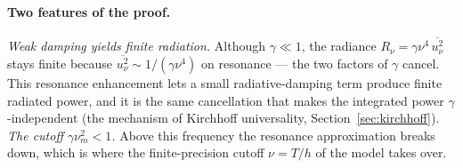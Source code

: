 \paragraph{Two features of the proof.}
\emph{Weak damping yields finite radiation.} Although $\gamma \ll 1$, the radiance $R_\nu = \gamma\nu^4\,\overline{u_\nu^2}$ stays finite because $\overline{u_\nu^2} \sim 1/(\gamma\nu^4)$ on resonance --- the two factors of $\gamma$ cancel. This resonance enhancement lets a small radiative-damping term produce finite radiated power, and it is the same cancellation that makes the integrated power $\gamma$-independent (the mechanism of Kirchhoff universality, Section~\ref{sec:kirchhoff}). \emph{The cutoff $\gamma\nu_m^2 < 1$.} Above this frequency the resonance approximation breaks down, which is where the finite-precision cutoff $\nu = T/h$ of the model takes over.

